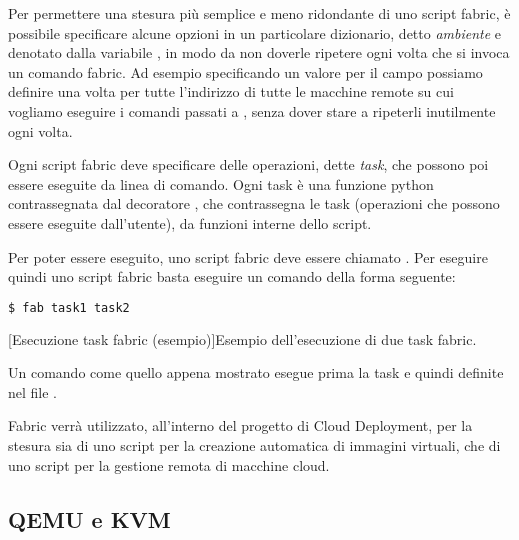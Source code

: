             Per permettere una stesura più semplice e meno ridondante di uno script fabric, è possibile specificare alcune opzioni in un particolare dizionario, detto \textit{ambiente} e denotato dalla variabile , in modo da non doverle ripetere ogni volta che si invoca un comando fabric. Ad esempio specificando un valore per il campo  possiamo definire una volta per tutte l'indirizzo di tutte le macchine remote su cui vogliamo eseguire i comandi passati a , senza dover stare a ripeterli inutilmente ogni volta.
            
            Ogni script fabric deve specificare delle operazioni, dette \textit{task}, che possono poi essere eseguite da linea di comando. Ogni task è una funzione python contrassegnata dal decoratore , che contrassegna le task (operazioni che possono essere eseguite dall'utente), da funzioni interne dello script.
            
            Per poter essere eseguito, uno script fabric deve essere chiamato . Per eseguire quindi uno script fabric basta eseguire un comando della forma seguente:
            
            \begin{center}
                \begin{minipage}{\linewidth}
                    \begin{lstlisting}[language=bash, gobble=22]
                        $ fab task1 task2
                    \end{lstlisting}
                    \captionsetup{textformat=empty,labelformat=empty} \vspace{-2em}
                    [Esecuzione task fabric (esempio)]{Esempio dell'esecuzione di due task fabric.}
                \end{minipage}
            \end{center}
            
            Un comando come quello appena mostrato esegue prima la task  e quindi  definite nel file .
            
            Fabric verrà utilizzato, all'interno del progetto di Cloud Deployment, per la stesura sia di uno script per la creazione automatica di immagini virtuali, che di uno script per la gestione remota di macchine cloud.
        
        \subsection{QEMU e KVM} \label{subsec:p;sl;qemu_kvm}
        
